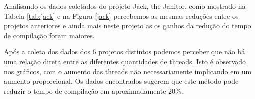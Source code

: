 Analisando os dados coletados do projeto Jack, the Janitor,
 como mostrado na Tabela \ref{tab:jack} e na Figura \ref{jack}
 percebemos as mesmas reduções entre os projetos anteriores
 e ainda mais neste projeto as os ganhos da redução do
 tempo de compilação foram maiores.

Após a coleta dos dados dos 6 projetos distintos podemos
 perceber que não há uma relação direta entre as diferentes
 quantidades de threads. Isto é observado nos gráficos,
 com o aumento das threads não necessariamente implicando
 em um aumento proporcional. Os dados encontrados
 sugerem que este método pode reduzir o tempo de
 compilação em aproximadamente 20\%.
